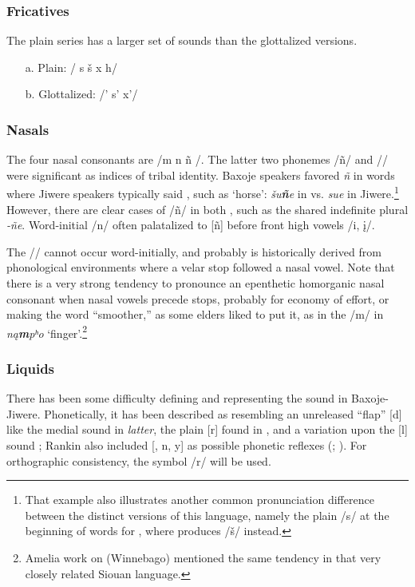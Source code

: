 \documentclass[output=paper]{LSP/langsci}
\begin{document}
\subsubsection{Fricatives}  The plain series has a larger set of sounds than the glottalized versions.  				
\begin{itemize}
\item[a.] Plain: 	  /  s  \v{s}  x   h/   								        	
\item[b.] Glottalized:  /'     s'    x'/	
\end{itemize}

\subsubsection{Nasals} 
The four nasal consonants are /m n ñ /.  The latter two phonemes /ñ/ and // were significant as indices of tribal identity. Baxoje speakers favored \textit{ñ} in words where Jiwere speakers typically said \textit{}, such as `horse': \textit{\v{s}u\textbf{ñ}e} in  vs. \textit{su\textbf{}e} in Jiwere.\footnote{That example also illustrates another common pronunciation difference between the distinct versions of this language, namely the plain /s/ at the beginning of words for , where  produces /\v{s}/ instead.}   However, there are clear cases of  /ñ/ in both , such as the shared indefinite plural \textit{-ñe}.  Word-initial /n/ often palatalized to [ñ] before front high vowels /i, \k{i}/.  

The // cannot occur word-initially, and probably is historically derived from phonological environments where a velar stop followed a nasal vowel.  Note that there is a very strong tendency to pronounce an  epenthetic homorganic nasal consonant when nasal vowels precede stops, probably for economy of effort, or making the word ``smoother,'' as some elders liked to put it, as in the /m/ in \textit{n\k{a}\textbf{m}pʰo} `finger'.\footnote{Amelia  work on  (Winnebago) mentioned the same tendency in that very closely related Siouan language.}

\subsubsection{Liquids}  
There has been some difficulty defining and representing the  sound in Baxoje-Jiwere.  Phonetically, it has been described as resembling an unreleased ``flap'' [d] like the medial sound in \textit{latter}, the plain [r] found in , and a variation upon the [l] sound \citep[235]{Whitman1947};  Rankin also included [, n, y] as possible phonetic reflexes (\citealt[346]{Wedel2001}; \citealt[447]{Schweitzer2001}). For orthographic consistency, the symbol /r/ will be used. 
\end{document}
